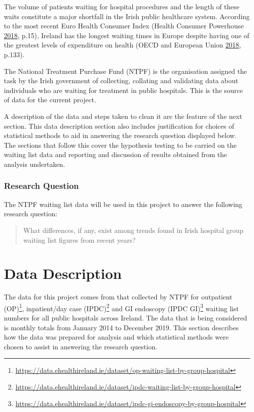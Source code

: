 \documentclass[
  12pt,
]{article}
\begin{document}
The volume of patients waiting for hospital procedures and the length of these waits constitute a major shortfall in the Irish public healthcare system. According to the most recent Euro Health Consumer Index (Health Consumer Powerhouse \protect\hyperlink{ref-health_consumer_powerhouse_euro_2018}{2018}, p.15), Ireland has the longest waiting times in Europe despite having one of the greatest levels of expenditure on health (OECD and European Union \protect\hyperlink{ref-oecd_health_2018}{2018}, p.133).

The National Treatment Purchase Fund (NTPF) is the organisation assigned the task by the Irish government of collecting, collating and validating data about individuals who are waiting for treatment in public hospitals. This is the source of data for the current project.

A description of the data and steps taken to clean it are the feature of the next section. This data description section also includes justification for choices of statistical methods to aid in answering the research question displayed below. The sections that follow this cover the hypothesis testing to be carried on the waiting list data and reporting and discussion of results obtained from the analysis undertaken.

\hypertarget{research-question}{%
\subsubsection{Research Question}\label{research-question}}

The NTPF waiting list data will be used in this project to answer the following research question:

\begin{quote}
What differences, if any, exist among trends found in Irish hospital group waiting list figures from recent years?
\end{quote}

\hypertarget{data-description}{%
\section{Data Description}\label{data-description}}

The data for this project comes from that collected by NTPF for outpatient (OP)\footnote{\url{https://data.ehealthireland.ie/dataset/op-waiting-list-by-group-hospital}}, inpatient/day case (IPDC)\footnote{\url{https://data.ehealthireland.ie/dataset/ipdc-waiting-list-by-group-hospital}} and GI endoscopy (IPDC GI)\footnote{\url{https://data.ehealthireland.ie/dataset/ipdc-gi-endoscopy-by-group-hospital}} waiting list numbers for all public hospitals across Ireland. The data that is being considered is monthly totals from January 2014 to December 2019. This section describes how the data was prepared for analysis and which statistical methods were chosen to assist in answering the research question.
\end{document}
